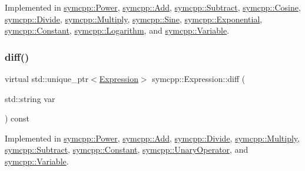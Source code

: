 Implemented in \mbox{\hyperlink{classsymcpp_1_1Power_ac628b9070382bde67b838f291f81ddc4}{symcpp\+::\+Power}}, \mbox{\hyperlink{classsymcpp_1_1Add_a58633f0c101ef1e7cc3952846054d27f}{symcpp\+::\+Add}}, \mbox{\hyperlink{classsymcpp_1_1Subtract_a97b707b4c72caa44342fe7952d616a4d}{symcpp\+::\+Subtract}}, \mbox{\hyperlink{classsymcpp_1_1Cosine_a63c4510666729dfcf5727299945c60f5}{symcpp\+::\+Cosine}}, \mbox{\hyperlink{classsymcpp_1_1Divide_a6e4eeef806e8bded246e87d0036effee}{symcpp\+::\+Divide}}, \mbox{\hyperlink{classsymcpp_1_1Multiply_adcd57ab1c1a27eb10aeeb572cdd14e5e}{symcpp\+::\+Multiply}}, \mbox{\hyperlink{classsymcpp_1_1Sine_aab90ccee3ae1fd2d832bdf041e8352c6}{symcpp\+::\+Sine}}, \mbox{\hyperlink{classsymcpp_1_1Exponential_ad6ea3a357a471f75e28761c9a9f0d54d}{symcpp\+::\+Exponential}}, \mbox{\hyperlink{classsymcpp_1_1Constant_aa5a5b0f6f06e6017ed641e8b89cd0cef}{symcpp\+::\+Constant}}, \mbox{\hyperlink{classsymcpp_1_1Logarithm_ac7315464088f7ef34cfce74e518b939a}{symcpp\+::\+Logarithm}}, and \mbox{\hyperlink{classsymcpp_1_1Variable_a5a434805a53a7c46e3659a8efdc7ba80}{symcpp\+::\+Variable}}.

\mbox{\label{classsymcpp_1_1Expression_a032fe8da79d5e231ca2d21a201c8f32d}} 
\subsubsection{\texorpdfstring{diff()}{diff()}}
{\footnotesize\ttfamily virtual std\+::unique\+\_\+ptr$<$\mbox{\hyperlink{classsymcpp_1_1Expression}{Expression}}$>$ symcpp\+::\+Expression\+::diff (\begin{DoxyParamCaption}\item[{std\+::string}]{var }\end{DoxyParamCaption}) const\hspace{0.3cm}{\ttfamily [pure virtual]}}



Implemented in \mbox{\hyperlink{classsymcpp_1_1Power_ac8fdf5b0ddfa04647ba93a6c383d4a7b}{symcpp\+::\+Power}}, \mbox{\hyperlink{classsymcpp_1_1Add_ac885da5635431d264c643618729f6cec}{symcpp\+::\+Add}}, \mbox{\hyperlink{classsymcpp_1_1Divide_aeecc60e1759b81ea65b0b95a62ff38df}{symcpp\+::\+Divide}}, \mbox{\hyperlink{classsymcpp_1_1Multiply_a835e55ada54a6c1eeb6d02ceeef83198}{symcpp\+::\+Multiply}}, \mbox{\hyperlink{classsymcpp_1_1Subtract_a4f9040e23694efcf093bf4b5c59b386b}{symcpp\+::\+Subtract}}, \mbox{\hyperlink{classsymcpp_1_1Constant_a19dd15712ce8630b758766e6478dec58}{symcpp\+::\+Constant}}, \mbox{\hyperlink{classsymcpp_1_1UnaryOperator_a73f6af837c67e65504e4bb82111d9557}{symcpp\+::\+Unary\+Operator}}, and \mbox{\hyperlink{classsymcpp_1_1Variable_ae17a02824954066f4e8b1ed6ba799ff0}{symcpp\+::\+Variable}}.

